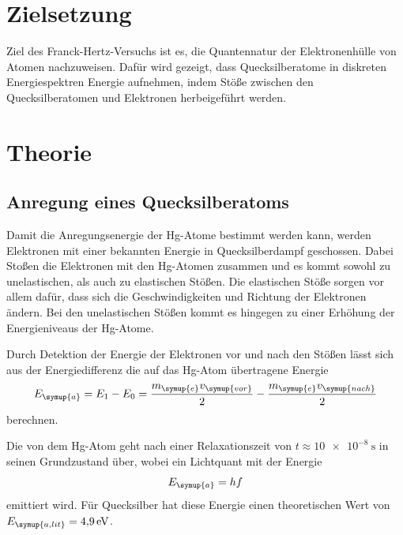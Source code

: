 \section{Zielsetzung}
Ziel des Franck-Hertz-Versuchs ist es, die Quantennatur der Elektronenhülle von Atomen nachzuweisen. Dafür wird gezeigt, dass 
Quecksilberatome in diskreten Energiespektren Energie aufnehmen, indem Stöße zwischen den Quecksilberatomen und Elektronen 
herbeigeführt werden.

\section{Theorie}
\label{sec:Theorie}
\subsection{Anregung eines Quecksilberatoms}
\label{sec:Anregung}
Damit die Anregungsenergie der Hg-Atome bestimmt werden kann, werden Elektronen mit einer bekannten Energie in Quecksilberdampf 
geschossen. Dabei Stoßen die Elektronen mit den Hg-Atomen zusammen und es kommt sowohl zu unelastischen, als auch zu elastischen 
Stößen.
Die elastischen Stöße sorgen vor allem dafür, dass sich die Geschwindigkeiten und Richtung der Elektronen ändern. Bei den unelastischen
Stößen kommt es hingegen zu einer Erhöhung der Energieniveaus der Hg-Atome.

Durch Detektion der Energie der Elektronen vor und nach den Stößen lässt sich aus der Energiedifferenz die auf das Hg-Atom übertragene
Energie
\begin{equation}
    E_{\symup{a}} = E_1-E_0 = \frac{m_{\symup{e}}v_{\symup{vor}}}{2}-\frac{m_{\symup{e}}v_{\symup{nach}}}{2}
    \label{eq:Anregungsenergie}
\end{equation}
berechnen.

Die von dem Hg-Atom geht nach einer Relaxationszeit von $t\approx\qty{10e-8}{\second}$ in seinen Grundzustand über,
wobei ein Lichtquant mit der Energie
\begin{equation}
    E_{\symup{a}} = hf
    \label{eq:Einstein ist smart}
\end{equation}
emittiert wird.
Für Quecksilber hat diese Energie einen theoretischen Wert von $E_{\symup{a,lit}} = \qty{4,9}{\electronvolt}$.

